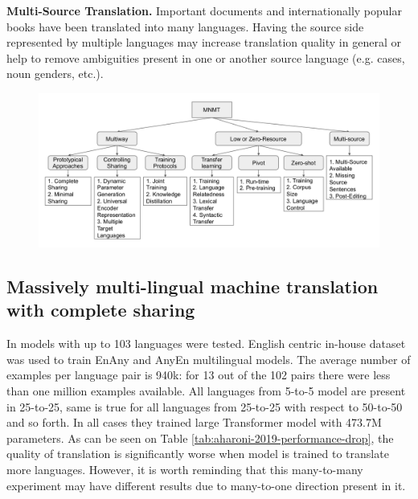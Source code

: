 \textbf{Multi-Source Translation.} Important documents and internationally popular books have
been translated into many languages. Having the source side represented by multiple languages
may increase translation quality in general or help to remove ambiguities present in one or another
source language (e.g. cases, noun genders, etc.).


\begin{figure}[h]
	\begin{minipage}{0.9\textwidth}
	\centering
	\includegraphics[width=1.0\columnwidth]{../img/dabre_2019_mnmt_categorized.png}
	\end{minipage}\hfill
	\label{fig:mnmt_categorized}
\end{figure}


\subsection{Massively multi-lingual machine translation with complete sharing}
\label{section:multitarget_theory}

In \cite{aharoni-etal-2019-massively} models with up to 103 languages were tested.
English centric in-house dataset was used to train En\to{}Any and Any\to{}En multilingual models.
The average number of examples per language pair is 940k:
for 13 out of the 102 pairs there were less than one million examples available.
All languages from 5-to-5 model are present in 25-to-25, same is true for all languages from 25-to-25 with respect to 50-to-50 and so forth.
In all cases they trained large Transformer model with 473.7M parameters.
As can be seen on Table \ref{tab:aharoni-2019-performance-drop}, the quality of translation
is significantly worse when model is trained to translate more languages.
However, it is worth reminding that this many-to-many experiment may have different results due to many-to-one direction present in it.

